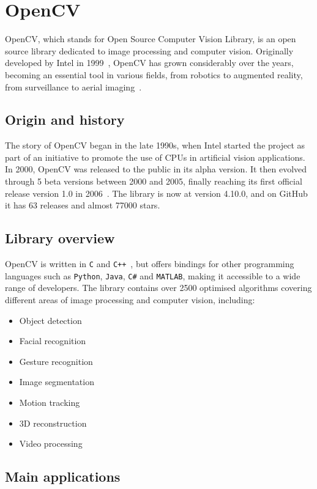 \section{OpenCV}\label{sec:opencv}
OpenCV, which stands for Open Source Computer Vision Library,
is an open source library dedicated to image processing and computer vision.
Originally developed by Intel in 1999~\cite{learning-opencv}, OpenCV has grown considerably over the years, becoming an
essential tool in various fields, from robotics to augmented reality, from surveillance to aerial imaging~\cite{learning-opencv}.

\subsection{Origin and history}\label{subsec:origin-and-history}
The story of OpenCV began in the late 1990s, when Intel started the project as part of an initiative
to promote the use of CPUs in artificial vision applications.
In 2000, OpenCV was released to the public in its alpha version.
It then evolved through 5 beta versions between 2000 and 2005, finally reaching its first official release
version 1.0 in 2006~\cite{learning-opencv}.
The library is now at version 4.10.0, and on GitHub it has 63 releases and almost 77000 stars.

\subsection{Library overview}\label{subsec:library-overview}
OpenCV is written in \texttt{C} and \texttt{C++}~\cite{learning-opencv}, but offers bindings for other programming
languages such as \texttt{Python}, \texttt{Java}, \texttt{C\#}
and \texttt{MATLAB}, making it accessible to a wide range of developers.
The library contains over 2500 optimised algorithms covering different areas of image processing and computer vision, including:
\begin{itemize}
	\item Object detection
	\item Facial recognition
	\item Gesture recognition
	\item Image segmentation
	\item Motion tracking
	\item 3D reconstruction
	\item Video processing
\end{itemize}

\subsection{Main applications}\label{subsec:main-applications}


